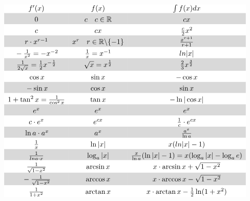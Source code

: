 \[ \begin{matrix}
\rowcolor{white} f'(x) & f(x) & \int f(x) dx\\
\rowcolor{lgray} \rule{0pt}{12pt}0 & c \quad c \in \mathbb{R} & cx \\
\rowcolor{white} \rule{0pt}{12pt}c & cx & \frac{c}{2}x^2 \\
\rowcolor{lgray} \rule{0pt}{12pt}r \cdot x^{r-1} & x^r \quad r \in \mathbb{R} \backslash \{-1\} & \frac{x^{r+1}}{r+1} \\
\rowcolor{white} \rule{0pt}{12pt}-\frac{1}{x^2} = -x^{-2} & \frac{1}{x} = x^{-1} & ln{|x|} \\
\rowcolor{lgray} \rule{0pt}{12pt}\frac{1}{2\sqrt{x}} = \frac{1}{2}x^{-\frac{1}{2}} & \sqrt{x} = x^{\frac{1}{2}} & \frac{2}{3}x^{\frac{3}{2}} \\
\rowcolor{white} \rule{0pt}{12pt}\cos x & \sin x & -\cos x \\
\rowcolor{lgray} \rule{0pt}{12pt}-\sin x & \cos x & \sin x \\
\rowcolor{white} \rule{0pt}{12pt}1 + \tan^2 x = \frac{1}{\cos^2 x} & \tan x & -\ln |\cos x| \\
\rowcolor{lgray} \rule{0pt}{12pt}e^x & e^x & e^x \\
\rowcolor{white} \rule{0pt}{12pt}c \cdot e^x & e^{cx} & \frac{1}{c} \cdot e^{cx} \\
\rowcolor{lgray} \rule{0pt}{12pt}\ln a \cdot a^x & a^x & \frac{a^x}{\ln a} \\
\rowcolor{white} \rule{0pt}{12pt}\frac{1}{x} & \ln |x| & x(ln |x| - 1) \\
\rowcolor{lgray} \rule{0pt}{12pt}\frac{1}{ln a \cdot x} & \log_a |x| & \frac{x}{\ln a}(\ln |x| - 1) = x(\log_a |x| - \log_a e) \\
\rowcolor{white} \rule{0pt}{12pt}\frac{1}{\sqrt{1 - x^2}} & \arcsin x & x \cdot \arcsin x + \sqrt{1 - x^2} \\
\rowcolor{lgray} \rule{0pt}{12pt}-\frac{1}{\sqrt{1 - x^2}} & \arccos x & x \cdot \arccos x - \sqrt{1 - x^2} \\
\rowcolor{white} \rule{0pt}{12pt}\frac{1}{1 + x^2} & \arctan x & x \cdot \arctan x - \frac{1}{2}\ln(1 + x^2) \\
\end{matrix} \]
\normalsize
